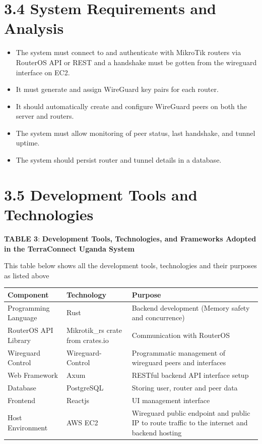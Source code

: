 \documentclass[12pt,a4paper,oneside]{report}
\begin{document}
\section{3.4 System Requirements and Analysis}

\begin{itemize}
  \item The system must connect to and authenticate with MikroTik routers via RouterOS API or REST and a handshake must be gotten from the wireguard interface on EC2. 
  \item It must generate and assign WireGuard key pairs for each router.
  \item It should automatically create and configure WireGuard peers on both the server and routers.
  \item The system must allow monitoring of peer status, last handshake, and tunnel uptime.
  \item The system should persist router and tunnel details in a database.
\end{itemize}

\section{3.5 Development Tools and Technologies}

\textbf{TABLE 3}: \textbf{Development Tools, Technologies, and Frameworks Adopted in the TerraConnect Uganda System}


This table below shows all the development tools, technologies and their purposes as listed above




\begin{table}[htbp]
  \centering
  {\small
  \begin{tabular}{|p{3.44cm}|p{2.82cm}|p{8.00cm}|}
    \hline
    Component & Technology & Purpose \\
    \hline
    Programming Language & Rust & Backend development (Memory safety and concurrence) \\
    RouterOS API Library & Mikrotik\_rs crate from crates.io & Communication with RouterOS \\
    Wireguard Control & Wireguard-Control & Programmatic management of wireguard peers and interfaces \\
    Web Framework & Axum & RESTful backend API interface setup \\
    Database & PostgreSQL & Storing user, router and peer data \\
    Frontend & Reactjs & UI management interface \\
    Host Environment & AWS EC2 & Wireguard public endpoint and public IP to route traffic to the internet and backend hosting \\
    \hline
  \end{tabular}
  }
\end{table}
\end{document}
